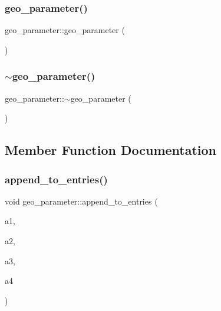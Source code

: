 \subsubsection{\texorpdfstring{geo\+\_\+parameter()}{geo\_parameter()}}
{\footnotesize\ttfamily geo\+\_\+parameter\+::geo\+\_\+parameter (\begin{DoxyParamCaption}{ }\end{DoxyParamCaption})}

\mbox{\label{classgeo__parameter_a3bccc6a0b3b60e438e06c6116db0d89b}} 
\subsubsection{\texorpdfstring{$\sim$geo\+\_\+parameter()}{~geo\_parameter()}}
{\footnotesize\ttfamily geo\+\_\+parameter\+::$\sim$geo\+\_\+parameter (\begin{DoxyParamCaption}{ }\end{DoxyParamCaption})}



\subsection{Member Function Documentation}
\mbox{\label{classgeo__parameter_a499c69553a09758bb9afa51ac12dc573}} 
\subsubsection{\texorpdfstring{append\+\_\+to\+\_\+entries()}{append\_to\_entries()}}
{\footnotesize\ttfamily void geo\+\_\+parameter\+::append\+\_\+to\+\_\+entries (\begin{DoxyParamCaption}\item[{\mbox{\hyperlink{galois_8h_a09fddde158a3a20bd2dcadb609de11dc}{I\+NT}}}]{a1,  }\item[{\mbox{\hyperlink{galois_8h_a09fddde158a3a20bd2dcadb609de11dc}{I\+NT}}}]{a2,  }\item[{\mbox{\hyperlink{galois_8h_a09fddde158a3a20bd2dcadb609de11dc}{I\+NT}}}]{a3,  }\item[{\mbox{\hyperlink{galois_8h_a09fddde158a3a20bd2dcadb609de11dc}{I\+NT}}}]{a4 }\end{DoxyParamCaption})}

